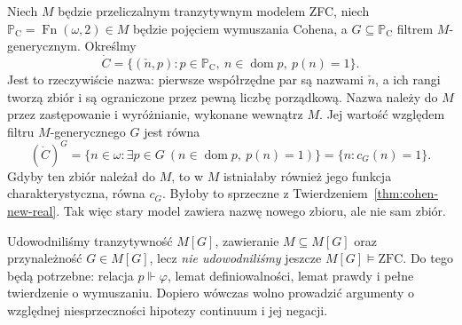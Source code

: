 \begin{przyklad}
\label{ex:forcing-cohen-name}
Niech $M$ będzie przeliczalnym tranzytywnym
modelem ZFC, niech
$\mathbb P_{\mathrm C}=\operatorname{Fn}(\omega,2)\in M$
będzie pojęciem wymuszania Cohena,
a $G\subseteq\mathbb P_{\mathrm C}$ filtrem
$M$-generycznym. Określmy
\[
 \dot C=\{(\check n,p):
 p\in\mathbb P_{\mathrm C},\
 n\in\operatorname{dom}p,\ p(n)=1\}.
\]
Jest to rzeczywiście nazwa: pierwsze
współrzędne par są nazwami $\check n$,
a ich rangi tworzą zbiór i są ograniczone
przez pewną liczbę porządkową.
Nazwa należy do $M$ przez zastępowanie
i wyróżnianie, wykonane wewnątrz $M$.
Jej wartość względem
filtru $M$-generycznego $G$ jest równa
\[
 (\dot C)^G
 =\{n\in\omega:\exists p\in G\
    (n\in\operatorname{dom}p,\ p(n)=1)\}
 =\{n:c_G(n)=1\}.
\]
Gdyby ten zbiór należał do $M$,
to w $M$ istniałaby również jego funkcja
charakterystyczna, równa $c_G$.
Byłoby to sprzeczne z
Twierdzeniem~\ref{thm:cohen-new-real}.
Tak więc stary model zawiera nazwę
nowego zbioru, ale nie sam zbiór.
\end{przyklad}

\begin{uwaga}
\label{rem:forcing-next}
Udowodniliśmy tranzytywność $M[G]$,
zawieranie $M\subseteq M[G]$ oraz
przynależność $G\in M[G]$, lecz
\emph{nie udowodniliśmy} jeszcze
$M[G]\models\mathrm{ZFC}$.
Do tego będą potrzebne: relacja
$p\Vdash\varphi$, lemat definiowalności,
lemat prawdy i pełne twierdzenie
o wymuszaniu. Dopiero wówczas wolno
prowadzić argumenty o względnej
niesprzeczności hipotezy continuum
i jej negacji.
\end{uwaga}
